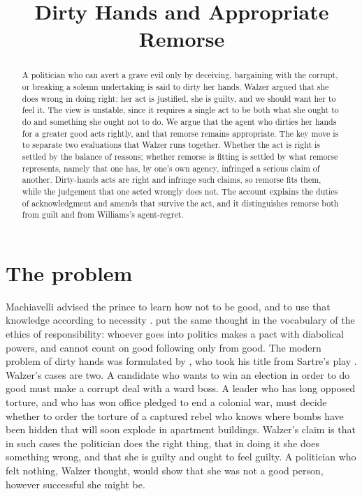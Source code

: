 \documentclass{situationist-preprint}
\title{Dirty Hands and Appropriate Remorse}
\begin{document}
\maketitle

\begin{abstract}
A politician who can avert a grave evil only by deceiving, bargaining with the corrupt, or breaking a solemn undertaking is said to dirty her hands. Walzer argued that she does wrong in doing right: her act is justified, she is guilty, and we should want her to feel it. The view is unstable, since it requires a single act to be both what she ought to do and something she ought not to do. We argue that the agent who dirties her hands for a greater good acts rightly, and that remorse remains appropriate. The key move is to separate two evaluations that Walzer runs together. Whether the act is right is settled by the balance of reasons; whether remorse is fitting is settled by what remorse represents, namely that one has, by one's own agency, infringed a serious claim of another. Dirty-hands acts are right and infringe such claims, so remorse fits them, while the judgement that one acted wrongly does not. The account explains the duties of acknowledgment and amends that survive the act, and it distinguishes remorse both from guilt and from Williams's agent-regret.
\end{abstract}

\section{The problem}

Machiavelli advised the prince to learn how not to be good, and to use that knowledge according to necessity \citep[ch.~15]{Machiavelli1532}. \citet{Weber1919} put the same thought in the vocabulary of the ethics of responsibility: whoever goes into politics makes a pact with diabolical powers, and cannot count on good following only from good. The modern problem of dirty hands was formulated by \citet{Walzer1973}, who took his title from Sartre's play \citep{Sartre1948}. Walzer's cases are two. A candidate who wants to win an election in order to do good must make a corrupt deal with a ward boss. A leader who has long opposed torture, and who has won office pledged to end a colonial war, must decide whether to order the torture of a captured rebel who knows where bombs have been hidden that will soon explode in apartment buildings. Walzer's claim is that in such cases the politician does the right thing, that in doing it she does something wrong, and that she is guilty and ought to feel guilty. A politician who felt nothing, Walzer thought, would show that she was not a good person, however successful she might be.
\end{document}

